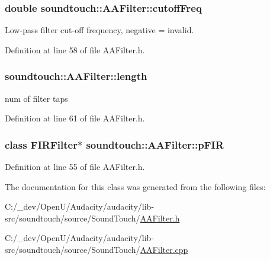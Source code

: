 \subsubsection[{\texorpdfstring{cutoff\+Freq}{cutoffFreq}}]{\setlength{\rightskip}{0pt plus 5cm}double soundtouch\+::\+A\+A\+Filter\+::cutoff\+Freq\hspace{0.3cm}{\ttfamily [protected]}}\hypertarget{classsoundtouch_1_1_a_a_filter_aae6ebe57383410c8f7e6eb7614293d50}{}\label{classsoundtouch_1_1_a_a_filter_aae6ebe57383410c8f7e6eb7614293d50}


Low-\/pass filter cut-\/off frequency, negative = invalid. 



Definition at line 58 of file A\+A\+Filter.\+h.

\subsubsection[{\texorpdfstring{length}{length}}]{ soundtouch\+::\+A\+A\+Filter\+::length\hspace{0.3cm}{\ttfamily [protected]}}\hypertarget{classsoundtouch_1_1_a_a_filter_a3c0b7fabd5293ccf4f509f3654ea1b9e}{}\label{classsoundtouch_1_1_a_a_filter_a3c0b7fabd5293ccf4f509f3654ea1b9e}


num of filter taps 



Definition at line 61 of file A\+A\+Filter.\+h.

\subsubsection[{\texorpdfstring{p\+F\+IR}{pFIR}}]{\setlength{\rightskip}{0pt plus 5cm}class {\bf F\+I\+R\+Filter}$\ast$ soundtouch\+::\+A\+A\+Filter\+::p\+F\+IR\hspace{0.3cm}{\ttfamily [protected]}}\hypertarget{classsoundtouch_1_1_a_a_filter_af4db0cc118541b4d627e12412789c9e5}{}\label{classsoundtouch_1_1_a_a_filter_af4db0cc118541b4d627e12412789c9e5}


Definition at line 55 of file A\+A\+Filter.\+h.



The documentation for this class was generated from the following files\+:\begin{DoxyCompactItemize}
\item 
C\+:/\+\_\+dev/\+Open\+U/\+Audacity/audacity/lib-\/src/soundtouch/source/\+Sound\+Touch/\hyperlink{_a_a_filter_8h}{A\+A\+Filter.\+h}\item 
C\+:/\+\_\+dev/\+Open\+U/\+Audacity/audacity/lib-\/src/soundtouch/source/\+Sound\+Touch/\hyperlink{_a_a_filter_8cpp}{A\+A\+Filter.\+cpp}\end{DoxyCompactItemize}
